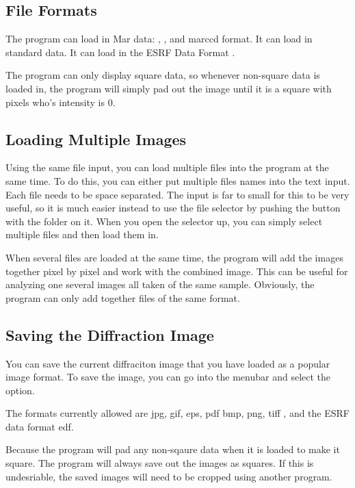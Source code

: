 \subsection{File Formats}

The program can load in Mar data: , 
, and  marccd format.
It can load in standard  data. 
It can load in the ESRF Data Format 
.

The program can only display square data, so whenever non-square
data is loaded in, the program will simply pad out the image until
it is a square with pixels who's intensity is 0. 


\subsection{Loading Multiple Images}

Using the same file input, you can load multiple files into 
the program at the same time. To do this, you can either put multiple
files names into the  text input. Each file needs to
be space separated. The input is far to small for this to be very useful,
so it is much easier instead to use the file selector by pushing the
button with the folder on it. When you open the selector up, you can 
simply select multiple files and then load them in.

When several files are loaded at the same time, the program will add
the images together pixel by pixel and work with the combined image.
This can be useful for analyzing one several images all taken of the
same sample. Obviously, the program can only add together files of
the same format.

\subsection{Saving the Diffraction Image}
You can save the current diffraciton image that you have loaded 
as a popular image format. To save the image, you can go into
the  menubar and select the  option.

The formats currently allowed are jpg, gif, eps, pdf bmp, png, 
tiff , and the ESRF data format edf.

Because the program will pad any non-sqaure data when
it is loaded to make it square. The program will always save out 
the images as squares. If this is undesriable, the saved images
will need to be cropped using another program.

